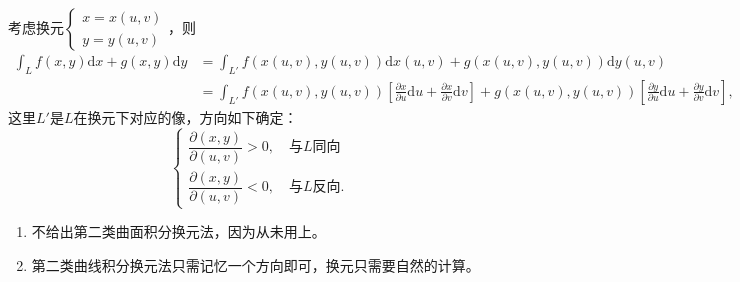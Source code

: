 \documentclass[../../main.tex]{subfiles}%
\begin{document}
\begin{theorem}[第二类曲线积分换元法]\label{theorem:第二类曲线积分换元法}
考虑换元$\begin{cases}x=x(u,v)\\y=y(u,v)\end{cases}$，则
\begin{align*}
\int_L f(x,y)\mathrm{d}x+g(x,y)\mathrm{d}y
&=\int_{L'} f(x(u,v),y(u,v))\mathrm{d}x(u,v)+g(x(u,v),y(u,v))\mathrm{d}y(u,v)\\
&=\int_{L'} f(x(u,v),y(u,v))\left[\frac{\partial x}{\partial u}\mathrm{d}u+\frac{\partial x}{\partial v}\mathrm{d}v\right]+g(x(u,v),y(u,v))\left[\frac{\partial y}{\partial u}\mathrm{d}u+\frac{\partial y}{\partial v}\mathrm{d}v\right],
\end{align*}
这里$L'$是$L$在换元下对应的像，方向如下确定：
\[
\begin{cases}
\dfrac{\partial(x,y)}{\partial(u,v)}>0,\quad \text{与}L\text{同向}\\[4pt]
\dfrac{\partial(x,y)}{\partial(u,v)}<0,\quad \text{与}L\text{反向}.
\end{cases}
\]
\end{theorem}
\begin{remark}
\begin{enumerate}[(1)]
\item 不给出第二类曲面积分换元法，因为从未用上。
\item 第二类曲线积分换元法只需记忆一个方向即可，换元只需要自然的计算。
\end{enumerate}
\end{remark}
\end{document}
